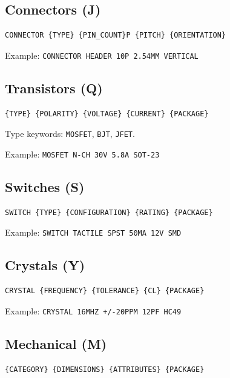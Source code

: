 \documentclass[11pt,a4paper]{article}
\begin{document}
\subsection{Connectors (J)}

\begin{verbatim}
CONNECTOR {TYPE} {PIN_COUNT}P {PITCH} {ORIENTATION}
\end{verbatim}

Example: \texttt{CONNECTOR HEADER 10P 2.54MM VERTICAL}

\subsection{Transistors (Q)}

\begin{verbatim}
{TYPE} {POLARITY} {VOLTAGE} {CURRENT} {PACKAGE}
\end{verbatim}

Type keywords: \texttt{MOSFET}, \texttt{BJT}, \texttt{JFET}.

Example: \texttt{MOSFET N-CH 30V 5.8A SOT-23}

\subsection{Switches (S)}

\begin{verbatim}
SWITCH {TYPE} {CONFIGURATION} {RATING} {PACKAGE}
\end{verbatim}

Example: \texttt{SWITCH TACTILE SPST 50MA 12V SMD}

\subsection{Crystals (Y)}

\begin{verbatim}
CRYSTAL {FREQUENCY} {TOLERANCE} {CL} {PACKAGE}
\end{verbatim}

Example: \texttt{CRYSTAL 16MHZ +/-20PPM 12PF HC49}

\subsection{Mechanical (M)}

\begin{verbatim}
{CATEGORY} {DIMENSIONS} {ATTRIBUTES} {PACKAGE}
\end{verbatim}
\end{document}
